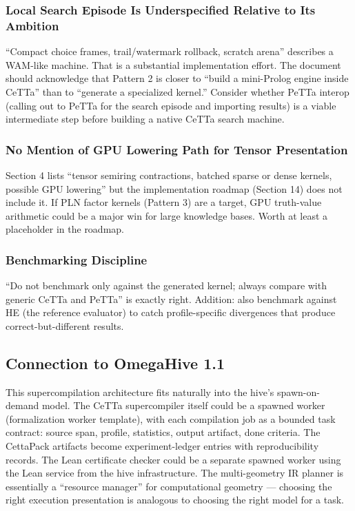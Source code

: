 \documentclass[11pt]{article}
\begin{document}
\subsubsection{Local Search Episode Is Underspecified Relative to Its Ambition}

``Compact choice frames, trail/watermark rollback, scratch arena'' describes a WAM-like machine. That is a substantial implementation effort. The document should acknowledge that Pattern 2 is closer to ``build a mini-Prolog engine inside CeTTa'' than to ``generate a specialized kernel.'' Consider whether PeTTa interop (calling out to PeTTa for the search episode and importing results) is a viable intermediate step before building a native CeTTa search machine.

\subsubsection{No Mention of GPU Lowering Path for Tensor Presentation}

Section 4 lists ``tensor semiring contractions, batched sparse or dense kernels, possible GPU lowering'' but the implementation roadmap (Section 14) does not include it. If PLN factor kernels (Pattern 3) are a target, GPU truth-value arithmetic could be a major win for large knowledge bases. Worth at least a placeholder in the roadmap.

\subsubsection{Benchmarking Discipline}

``Do not benchmark only against the generated kernel; always compare with generic CeTTa and PeTTa'' is exactly right. Addition: also benchmark against HE (the reference evaluator) to catch profile-specific divergences that produce correct-but-different results.

\subsection{Connection to OmegaHive 1.1}

This supercompilation architecture fits naturally into the hive's spawn-on-demand model. The CeTTa supercompiler itself could be a spawned worker (formalization worker template), with each compilation job as a bounded task contract: source span, profile, statistics, output artifact, done criteria. The CettaPack artifacts become experiment-ledger entries with reproducibility records. The Lean certificate checker could be a separate spawned worker using the Lean service from the hive infrastructure. The multi-geometry IR planner is essentially a ``resource manager'' for computational geometry --- choosing the right execution presentation is analogous to choosing the right model for a task.
\end{document}
